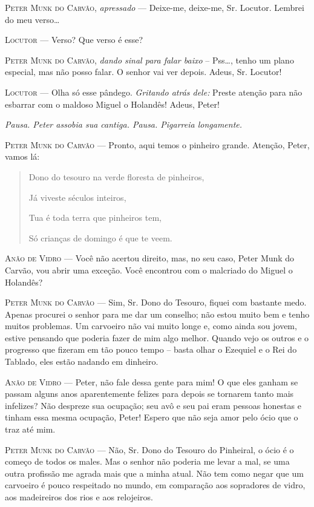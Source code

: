 \textsc{Peter Munk do Carvão}, \emph{apressado} --- Deixe-me, deixe-me, Sr.
Locutor. Lembrei do meu verso\ldots{}

\textsc{Locutor} --- Verso? Que verso é esse?

\textsc{Peter Munk do Carvão}, \emph{dando sinal para falar baixo} --
Pss\ldots{}, tenho um plano especial, mas não posso falar. O senhor vai
ver depois. Adeus, Sr. Locutor!

\textsc{Locutor} --- Olha só esse pândego. \emph{Gritando atrás dele:} Preste
atenção para não esbarrar com o maldoso Miguel o Holandês! Adeus, Peter!

\emph{Pausa. Peter assobia sua cantiga. Pausa. Pigarreia longamente.}

\textsc{Peter Munk do Carvão} --- Pronto, aqui temos o pinheiro grande. Atenção,
Peter, vamos lá:

\begin{quote}
Dono do tesouro na verde floresta de pinheiros,

Já viveste séculos inteiros,

Tua é toda terra que pinheiros tem,

Só crianças de domingo é que te veem.
\end{quote}

\textsc{Anão de Vidro} --- Você não acertou direito, mas, no seu caso, Peter Munk
do Carvão, vou abrir uma exceção. Você encontrou com o malcriado do
Miguel o Holandês?

\textsc{Peter Munk do Carvão} --- Sim, Sr. Dono do Tesouro, fiquei com bastante
medo. Apenas procurei o senhor para me dar um conselho; não estou muito
bem e tenho muitos problemas. Um carvoeiro não vai muito longe e, como
ainda sou jovem, estive pensando que poderia fazer de mim algo melhor.
Quando vejo os outros e o progresso que fizeram em tão pouco tempo --
basta olhar o Ezequiel e o Rei do Tablado, eles estão nadando em
dinheiro.

\textsc{Anão de Vidro} --- Peter, não fale dessa gente para mim! O que eles ganham
se passam alguns anos aparentemente felizes para depois se tornarem
tanto mais infelizes? Não despreze sua ocupação; seu avô e seu pai eram
pessoas honestas e tinham essa mesma ocupação, Peter! Espero que não
seja amor pelo ócio que o traz até mim.

\textsc{Peter Munk do Carvão} --- Não, Sr. Dono do Tesouro do Pinheiral, o ócio é
o começo de todos os males. Mas o senhor não poderia me levar a mal, se
uma outra profissão me agrada mais que a minha atual. Não tem como negar
que um carvoeiro é pouco respeitado no mundo, em comparação aos
sopradores de vidro, aos madeireiros dos rios e aos relojeiros.

